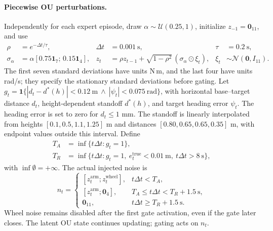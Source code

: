 \documentclass[10pt]{article}
\begin{document}
\paragraph{Piecewise OU perturbations.}
Independently for each expert episode, draw $\alpha\sim\mathcal U(0.25,1)$,
initialize $z_{-1}=\mathbf0_{11}$, and use
\begin{align}
\rho &= e^{-\Delta t/\tau}, & \Delta t&=0.001\ \mathrm{s}, &\tau&=0.2\ \mathrm{s},\\
\sigma_\alpha&=\alpha[0.75\mathbf1_7;\,0.15\mathbf1_4], &
z_t&=\rho z_{t-1}+\sqrt{1-\rho^2}\,(\sigma_\alpha\odot\xi_t), &
\xi_t&\sim\mathcal N(\mathbf0,I_{11}).
\end{align}
The first seven standard deviations have units N\,m, and the last four have units
rad/s; they specify the stationary standard deviations before gating.
Let $g_t=\mathbf1\{|d_t-d^*(h)|<0.12\ \mathrm m\ \land\
|\psi_t|<0.075\ \mathrm{rad}\}$, with horizontal base--target distance $d_t$,
height-dependent standoff $d^*(h)$, and target heading error $\psi_t$.
The heading error is set to zero for $d_t\le 1$ mm.
The standoff is linearly interpolated from heights
$[0.1,0.5,1.1,1.25]$ m and distances $[0.80,0.65,0.65,0.35]$ m,
with endpoint values outside this interval. Define
\begin{align}
T_A&=\inf\{t\Delta t:g_t=1\},\\
T_R&=\inf\{t\Delta t:g_t=1,\ e_t^{\mathrm{true}}<0.01\ \mathrm m,
\ t\Delta t>8\ \mathrm s\},
\end{align}
with $\inf\emptyset=+\infty$. The actual injected noise is
\begin{equation}\label{eq:piecewise-ou}
n_t=\begin{cases}
[z_t^{\mathrm{arm}};z_t^{\mathrm{wheel}}], & t\Delta t<T_A,\\
[z_t^{\mathrm{arm}};\mathbf0_4], & T_A\le t\Delta t<T_R+1.5\ \mathrm s,\\
\mathbf0_{11}, & t\Delta t\ge T_R+1.5\ \mathrm s.
\end{cases}
\end{equation}
Wheel noise remains disabled after the first gate activation, even if the gate
later closes. The latent OU state continues updating; gating acts on $n_t$.
\end{document}
